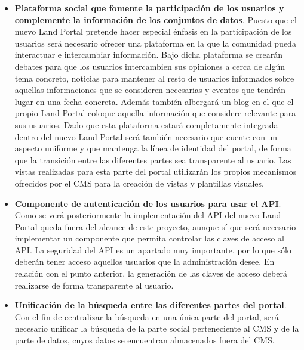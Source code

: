 \begin{itemize}
\item \textbf{Plataforma social que fomente la participación de los usuarios y complemente la información de los conjuntos de datos}.  Puesto que el nuevo Land Portal pretende hacer especial énfasis en la participación de los usuarios será necesario ofrecer una plataforma en la que la comunidad pueda interactuar e intercambiar información.  Bajo dicha plataforma se crearán debates para que los usuarios intercambien sus opiniones a cerca de algún tema concreto, noticias para mantener al resto de usuarios informados sobre aquellas informaciones que se consideren necesarias y eventos que tendrán lugar en una fecha concreta.  Además también albergará un blog en el que el propio Land Portal coloque aquella información que considere relevante para sus usuarios.\newline
Dado que esta plataforma estará completamente integrada dentro del nuevo Land Portal será también necesario que cuente con un aspecto uniforme y que mantenga la línea de identidad del portal, de forma que la transición entre las diferentes partes sea transparente al usuario.  Las vistas realizadas para esta parte del portal utilizarán los propios mecanismos ofrecidos por el CMS para la creación de vistas y plantillas visuales. 
\item \textbf{Componente de autenticación de los usuarios para usar el API}.  Como se verá posteriormente la implementación del API del nuevo Land Portal queda fuera del alcance de este proyecto, aunque sí que será necesario implementar un componente que permita controlar las claves de acceso al API.  La seguridad del API es un apartado muy importante, por lo que sólo deberán tener acceso aquellos usuarios que la administración desee.  En relación con el punto anterior, la generación de las claves de acceso deberá realizarse de forma transparente al usuario.
\item \textbf{Unificación de la búsqueda entre las diferentes partes del portal}.  Con el fin de centralizar la búsqueda en una única parte del portal, será necesario unificar la búsqueda de la parte social perteneciente al CMS y de la parte de datos, cuyos datos se encuentran almacenados fuera del CMS.
\end{itemize}

